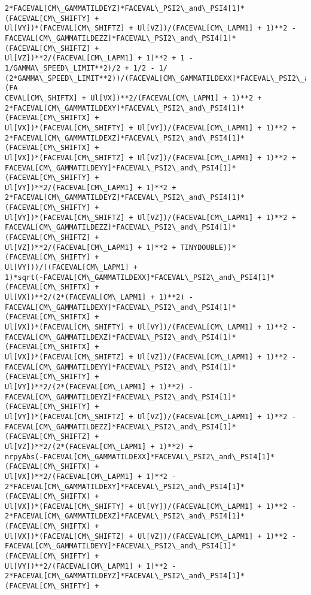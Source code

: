\documentclass[landscape,letterpaper,10pt,english]{article}
\begin{document}
\begin{Verbatim}[commandchars=\\\{\}]
2*FACEVAL[CM\_GAMMATILDEYZ]*FACEVAL\_PSI2\_and\_PSI4[1]*(FACEVAL[CM\_SHIFTY] +
Ul[VY])*(FACEVAL[CM\_SHIFTZ] + Ul[VZ])/(FACEVAL[CM\_LAPM1] + 1)**2 -
FACEVAL[CM\_GAMMATILDEZZ]*FACEVAL\_PSI2\_and\_PSI4[1]*(FACEVAL[CM\_SHIFTZ] +
Ul[VZ])**2/(FACEVAL[CM\_LAPM1] + 1)**2 + 1 - 1/GAMMA\_SPEED\_LIMIT**2)/2 + 1/2 - 1/
(2*GAMMA\_SPEED\_LIMIT**2))/(FACEVAL[CM\_GAMMATILDEXX]*FACEVAL\_PSI2\_and\_PSI4[1]*(FA
CEVAL[CM\_SHIFTX] + Ul[VX])**2/(FACEVAL[CM\_LAPM1] + 1)**2 +
2*FACEVAL[CM\_GAMMATILDEXY]*FACEVAL\_PSI2\_and\_PSI4[1]*(FACEVAL[CM\_SHIFTX] +
Ul[VX])*(FACEVAL[CM\_SHIFTY] + Ul[VY])/(FACEVAL[CM\_LAPM1] + 1)**2 +
2*FACEVAL[CM\_GAMMATILDEXZ]*FACEVAL\_PSI2\_and\_PSI4[1]*(FACEVAL[CM\_SHIFTX] +
Ul[VX])*(FACEVAL[CM\_SHIFTZ] + Ul[VZ])/(FACEVAL[CM\_LAPM1] + 1)**2 +
FACEVAL[CM\_GAMMATILDEYY]*FACEVAL\_PSI2\_and\_PSI4[1]*(FACEVAL[CM\_SHIFTY] +
Ul[VY])**2/(FACEVAL[CM\_LAPM1] + 1)**2 +
2*FACEVAL[CM\_GAMMATILDEYZ]*FACEVAL\_PSI2\_and\_PSI4[1]*(FACEVAL[CM\_SHIFTY] +
Ul[VY])*(FACEVAL[CM\_SHIFTZ] + Ul[VZ])/(FACEVAL[CM\_LAPM1] + 1)**2 +
FACEVAL[CM\_GAMMATILDEZZ]*FACEVAL\_PSI2\_and\_PSI4[1]*(FACEVAL[CM\_SHIFTZ] +
Ul[VZ])**2/(FACEVAL[CM\_LAPM1] + 1)**2 + TINYDOUBLE))*(FACEVAL[CM\_SHIFTY] +
Ul[VY]))/((FACEVAL[CM\_LAPM1] +
1)*sqrt(-FACEVAL[CM\_GAMMATILDEXX]*FACEVAL\_PSI2\_and\_PSI4[1]*(FACEVAL[CM\_SHIFTX] +
Ul[VX])**2/(2*(FACEVAL[CM\_LAPM1] + 1)**2) -
FACEVAL[CM\_GAMMATILDEXY]*FACEVAL\_PSI2\_and\_PSI4[1]*(FACEVAL[CM\_SHIFTX] +
Ul[VX])*(FACEVAL[CM\_SHIFTY] + Ul[VY])/(FACEVAL[CM\_LAPM1] + 1)**2 -
FACEVAL[CM\_GAMMATILDEXZ]*FACEVAL\_PSI2\_and\_PSI4[1]*(FACEVAL[CM\_SHIFTX] +
Ul[VX])*(FACEVAL[CM\_SHIFTZ] + Ul[VZ])/(FACEVAL[CM\_LAPM1] + 1)**2 -
FACEVAL[CM\_GAMMATILDEYY]*FACEVAL\_PSI2\_and\_PSI4[1]*(FACEVAL[CM\_SHIFTY] +
Ul[VY])**2/(2*(FACEVAL[CM\_LAPM1] + 1)**2) -
FACEVAL[CM\_GAMMATILDEYZ]*FACEVAL\_PSI2\_and\_PSI4[1]*(FACEVAL[CM\_SHIFTY] +
Ul[VY])*(FACEVAL[CM\_SHIFTZ] + Ul[VZ])/(FACEVAL[CM\_LAPM1] + 1)**2 -
FACEVAL[CM\_GAMMATILDEZZ]*FACEVAL\_PSI2\_and\_PSI4[1]*(FACEVAL[CM\_SHIFTZ] +
Ul[VZ])**2/(2*(FACEVAL[CM\_LAPM1] + 1)**2) +
nrpyAbs(-FACEVAL[CM\_GAMMATILDEXX]*FACEVAL\_PSI2\_and\_PSI4[1]*(FACEVAL[CM\_SHIFTX] +
Ul[VX])**2/(FACEVAL[CM\_LAPM1] + 1)**2 -
2*FACEVAL[CM\_GAMMATILDEXY]*FACEVAL\_PSI2\_and\_PSI4[1]*(FACEVAL[CM\_SHIFTX] +
Ul[VX])*(FACEVAL[CM\_SHIFTY] + Ul[VY])/(FACEVAL[CM\_LAPM1] + 1)**2 -
2*FACEVAL[CM\_GAMMATILDEXZ]*FACEVAL\_PSI2\_and\_PSI4[1]*(FACEVAL[CM\_SHIFTX] +
Ul[VX])*(FACEVAL[CM\_SHIFTZ] + Ul[VZ])/(FACEVAL[CM\_LAPM1] + 1)**2 -
FACEVAL[CM\_GAMMATILDEYY]*FACEVAL\_PSI2\_and\_PSI4[1]*(FACEVAL[CM\_SHIFTY] +
Ul[VY])**2/(FACEVAL[CM\_LAPM1] + 1)**2 -
2*FACEVAL[CM\_GAMMATILDEYZ]*FACEVAL\_PSI2\_and\_PSI4[1]*(FACEVAL[CM\_SHIFTY] +

\end{Verbatim}
\end{document}
